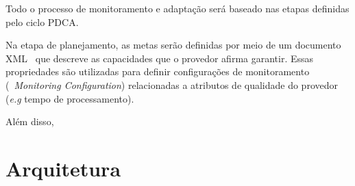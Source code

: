 Todo o processo de monitoramento e adaptação será baseado nas etapas definidas pelo ciclo PDCA. 

Na etapa de planejamento, as metas serão definidas por meio de um documento XML~\cite{xml} que descreve as capacidades que o provedor afirma garantir. Essas propriedades são utilizadas para definir configurações de monitoramento (~\textit{Monitoring Configuration}) relacionadas a atributos de qualidade do provedor (\textit{e.g} tempo de processamento).

Além disso, 

\section{Arquitetura}
